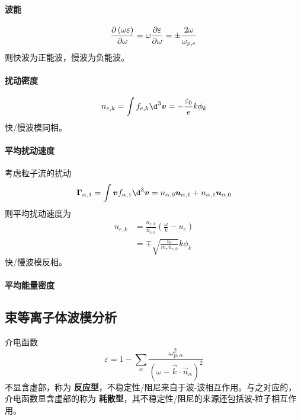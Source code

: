 \paragraph{波能}
\begin{equation}
\pdv{\left(\omega \varepsilon\right)}{\omega}
= \omega \pdv{\varepsilon}{\omega}
= \pm \frac{2 \omega}{\omega_{p,e}}
\end{equation}
则快波为正能波，慢波为负能波。

\paragraph{扰动密度}
\begin{equation}
n_{e,k} = \int f_{e,k} \d^3\vec{v}
= - \frac{\varepsilon_0}{e} k \phi_k
\end{equation}
快/慢波模同相。

\paragraph{平均扰动速度}
考虑粒子流的扰动
\begin{equation}
\vec{\Gamma}_{\alpha,1} = \int \vec{v} f_{\alpha,1} \d^3\vec{v}
= n_{\alpha,0} \vec{u}_{\alpha,1} + n_{\alpha,1} \vec{u}_{\alpha,0}
\end{equation}
则平均扰动速度为
\begin{equation}\begin{aligned}
u_{e,k} &= \frac{n_{e,k}}{n_{e,0}} \left(\frac{\omega}{k} - u_e \right) \\
&= \mp \sqrt{\frac{\varepsilon_0}{m_e n_{e,0}}} k \phi_k
\end{aligned}\end{equation}
快/慢波模反相。

\paragraph{平均能量密度}

\subsection{束等离子体波模分析}

介电函数
\begin{equation}
\varepsilon = 1 - \sum_\alpha \frac{\omega_{p,\alpha}^2}{\left( \omega - \vec{k} \cdot \vec{u}_\alpha \right)^2}
\end{equation}
不显含虚部，称为 \textbf{反应型}，不稳定性/阻尼来自于波-波相互作用。与之对应的，介电函数显含虚部的称为 \textbf{耗散型}，其不稳定性/阻尼的来源还包括波-粒子相互作用。

